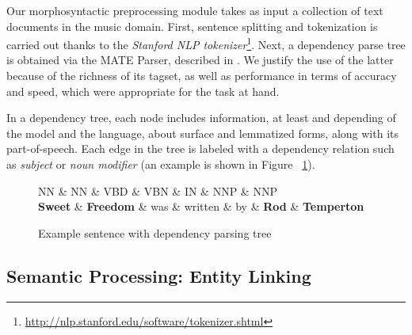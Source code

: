 Our morphosyntactic preprocessing module takes as input a collection of text documents in the music domain. First, sentence splitting and tokenization is carried out thanks to the \textit{Stanford NLP tokenizer}\footnote{\url{http://nlp.stanford.edu/software/tokenizer.shtml}}. 
Next, a dependency parse tree is obtained via the MATE Parser, described in \cite{Bohnet2010}. We justify the use of the latter because of the richness of its tagset, as well as performance in terms of accuracy and speed, which were appropriate for the task at hand.

In a dependency tree, each node includes information, at least and depending of the model and the language, about surface and lemmatized forms, along with its part-of-speech. Each edge in the tree is labeled with a dependency relation such as \textit{subject} or \textit{noun modifier} (an example is shown in Figure ~\ref{fig:sampletree}).


\begin{figure}[!htb]
\centering
\begin{dependency}
\begin{deptext}[column sep=.0cm]
NN \& NN \& VBD \& VBN \& IN \& NNP \& NNP \\
\textbf{Sweet} \& \textbf{Freedom} \& was \& written \& by \& \textbf{Rod} \& \textbf{Temperton} \\
\end{deptext}




\end{dependency}
\vspace*{-5mm}
\caption{Example sentence with dependency parsing tree}
\label{fig:sampletree}
\end{figure}


\subsection{Semantic Processing: Entity Linking}
\label{sec:method:entitylinking}

